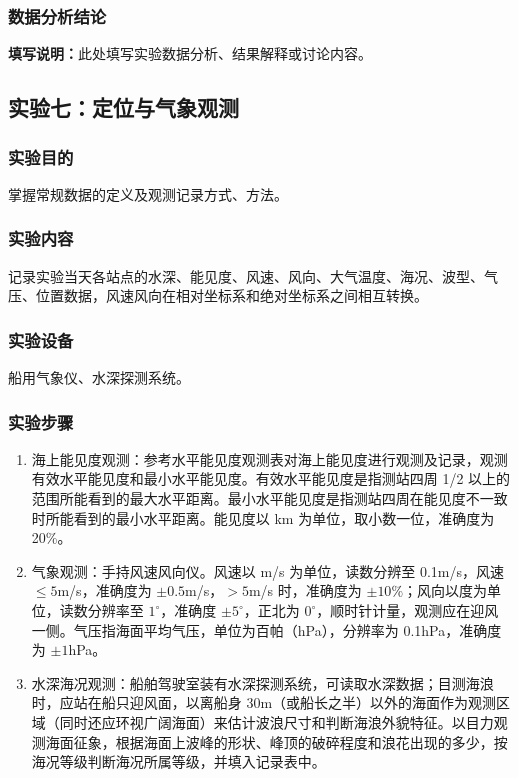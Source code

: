 \documentclass[UTF8,a4paper,12pt]{ctexart}
\begin{document}
\subsubsection{数据分析结论}
\noindent\textbf{填写说明：}此处填写实验数据分析、结果解释或讨论内容。\par
{}
\subsection{实验七：定位与气象观测}

\subsubsection{实验目的}
掌握常规数据的定义及观测记录方式、方法。

\subsubsection{实验内容}
记录实验当天各站点的水深、能见度、风速、风向、大气温度、海况、波型、气压、位置数据，风速风向在相对坐标系和绝对坐标系之间相互转换。

\subsubsection{实验设备}
船用气象仪、水深探测系统。

\subsubsection{实验步骤}
\begin{enumerate}[label=（\arabic*）]
  \item 海上能见度观测：参考水平能见度观测表对海上能见度进行观测及记录，观测有效水平能见度和最小水平能见度。有效水平能见度是指测站四周 1/2 以上的范围所能看到的最大水平距离。最小水平能见度是指测站四周在能见度不一致时所能看到的最小水平距离。能见度以 km 为单位，取小数一位，准确度为 20\%。
  \item 气象观测：手持风速风向仪。风速以 m/s 为单位，读数分辨至 0.1m/s，风速 \(\leq 5\)m/s，准确度为 \(\pm 0.5\)m/s，\(>5\)m/s 时，准确度为 \(\pm 10\%\)；风向以度为单位，读数分辨率至 \(1^\circ\)，准确度 \(\pm 5^\circ\)，正北为 \(0^\circ\)，顺时针计量，观测应在迎风一侧。气压指海面平均气压，单位为百帕（hPa），分辨率为 0.1hPa，准确度为 \(\pm 1\)hPa。
  \item 水深海况观测：船舶驾驶室装有水深探测系统，可读取水深数据；目测海浪时，应站在船只迎风面，以离船身 30m（或船长之半）以外的海面作为观测区域（同时还应环视广阔海面）来估计波浪尺寸和判断海浪外貌特征。以目力观测海面征象，根据海面上波峰的形状、峰顶的破碎程度和浪花出现的多少，按海况等级判断海况所属等级，并填入记录表中。
\end{enumerate}
\end{document}
